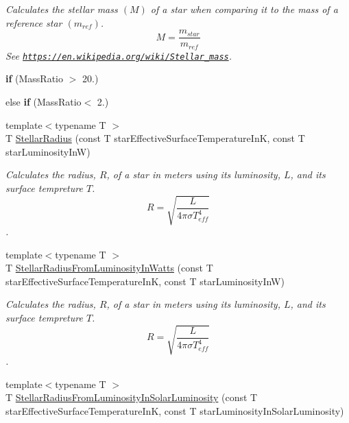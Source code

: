 \begin{DoxyCompactItemize}
\begin{DoxyCompactList}\small\item\em Calculates the stellar mass $(M)$ of a star when comparing it to the mass of a reference star $(m_{ref})$. \[M=\frac{m_{star}}{m_{ref}}\] See \href{https://en.wikipedia.org/wiki/Stellar_mass}{\tt https\+://en.\+wikipedia.\+org/wiki/\+Stellar\+\_\+mass}. \end{DoxyCompactList}\item 
\mbox{\label{namespace_e_g_x_phys_a479def48dd2b5ab72c189b1345426aca}} 
{\bfseries if} (Mass\+Ratio $>$ 20.)
\item 
\mbox{\label{namespace_e_g_x_phys_a137d35538778455b2bad69dbbe3f8049}} 
else {\bfseries if} (Mass\+Ratio$<$ 2.)
\item 
{\footnotesize template$<$typename T $>$ }\\T \mbox{\hyperlink{group___e_g_x_phys-_stellar_radius_ga612cd22c37341a1864cd2fc5c858e18e}{Stellar\+Radius}} (const T star\+Effective\+Surface\+Temperature\+InK, const T star\+Luminosity\+InW)
\begin{DoxyCompactList}\small\item\em Calculates the radius, $R$, of a star in meters using its luminosity, $L$, and its surface tempreture $T$. \[R=\sqrt{\dfrac{L}{4\pi \sigma T_{eff}^4}}\]. \end{DoxyCompactList}\item 
{\footnotesize template$<$typename T $>$ }\\T \mbox{\hyperlink{group___e_g_x_phys-_stellar_radius_ga59f0d5d89a857d30bff4c93713ee5bd9}{Stellar\+Radius\+From\+Luminosity\+In\+Watts}} (const T star\+Effective\+Surface\+Temperature\+InK, const T star\+Luminosity\+InW)
\begin{DoxyCompactList}\small\item\em Calculates the radius, $R$, of a star in meters using its luminosity, $L$, and its surface tempreture $T$. \[R=\sqrt{\dfrac{L}{4\pi \sigma T_{eff}^4}}\]. \end{DoxyCompactList}\item 
{\footnotesize template$<$typename T $>$ }\\T \mbox{\hyperlink{group___e_g_x_phys-_stellar_radius_ga49f0848777ba12cdfc78d112d82036ce}{Stellar\+Radius\+From\+Luminosity\+In\+Solar\+Luminosity}} (const T star\+Effective\+Surface\+Temperature\+InK, const T star\+Luminosity\+In\+Solar\+Luminosity)

\end{DoxyCompactItemize}
